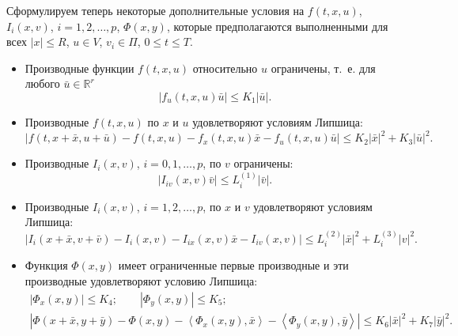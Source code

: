 Сформулируем теперь некоторые дополнительные условия на $f(t,x,u)$, $I_{i}(x, v)$, $i=1, 2, \dots, p$, $\Phi(x,y)$, которые предполагаются выполненными для всех $|x|\le R$, $u\in V$, $v_{i} \in \Pi$, $0\le t\le T$.

\begin{itemize}


\item[4)] Производные функции $f(t,x,u)$ относительно $u$ ограничены, т.~е. для любого $\bar{u}\in \mathbb R^{r} $
\hypertarget{sha:4)}{}
\begin{equation} \label{sha:24} 
\left|f_{u}(t,x,u)\bar{u}\right|\le K_{1} \left|\bar{u}\right|.                                                                                      
\end{equation} 

\hypertarget{sha:5)}{}
\item[5)] 
Производные $f(t,x,u)$ по $x$ и $u$ удовлетворяют условиям Липшица:
\begin{equation} \label{sha:25} 
\left|f\left(t,x{+}\bar{x}, u{+}\bar{u}\right)-f(t,x,u)-f_{x}(t,x,u)\bar{x}-f_{u}(t,x,u)\bar{u}\right|\le K_{2} \left|\bar{x}\right|^{2} +K_{3} \left|\bar{u}\right|^{2} . 
\end{equation} 

\hypertarget{sha:6)}{}
\item[6)] 
Производные $I_{i}(x,v)$, $i=0, 1, \dots, p$, по $v$ ограничены:
\begin{equation} \label{sha:26} 
\left|I_{iv}(x,v)\bar{v}\right|\le L_{i}^{(1)}\left|\bar{v}\right|.
\end{equation} 

\hypertarget{sha:7)}{}
\item[7)] 
Производные $I_{i}(x,v)$, $i=1, 2, \dots, p$, по $x$ и $v$ удовлетворяют условиям Липшица:
\begin{equation} \label{sha:27} 
\left|I_{i}\left(x+\bar{x},v+\bar{v}\right)-I_{i}(x,v)-I_{ix}(x,v)\bar{x}-I_{iv}(x,v)\right|\le L_{i}^{(2)}\left|\bar{x}\right|^{2}+L_{i}^{(3)}\left|v\right|^{2}. 
\end{equation} 

\hypertarget{sha:8)}{}
\item[8)] 
Функция $\Phi(x, y)$ имеет ограниченные  первые производные и эти производные удовлетворяют условию Липшица:
\begin{gather} \label{sha:28} 
\left|\Phi_x(x,y)\right|\le K_{4}; \qquad \left|\Phi_{y}(x,y)\right|\le K_{5}; 
\\
\label{sha:29} 
\left|\Phi\left(x{+}\bar{x},y{+}\bar{y}\right)-\Phi(x,y)-\left\langle\Phi_{x}(x,y),\bar{x}\right\rangle-\left\langle\Phi_{y}(x,y),\bar{y}\right\rangle\right|\le K_{6}\left|\bar{x}\right|^{2}+K_{7}\left|\bar{y}\right|^{2} . 
\end{gather} 

\end{itemize}


